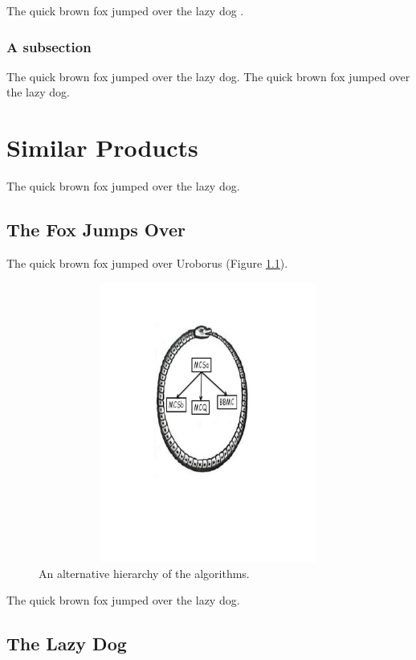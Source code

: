 \documentclass{l4proj}
\begin{document}
The quick brown fox jumped over the lazy dog \cite{DIMACS}.


\subsection{A subsection}

The quick brown fox \cite{fahle} jumped over the lazy dog.
The quick brown fox jumped over the lazy dog.

\chapter{Similar Products}
The quick brown fox jumped over the lazy dog.

\section{The Fox Jumps Over}

The quick brown fox jumped over Uroborus (Figure \ref{uroborus}).


\begin{figure}
\centering
\includegraphics[height=9.2cm,width=13.2cm]{uroboros.pdf}
\vspace{-30mm}
\caption{An alternative hierarchy of the algorithms.}
\label{uroborus}
\end{figure}


The quick brown fox jumped over \cite{ckt} the lazy dog.


\section{The Lazy Dog}
\end{document}
